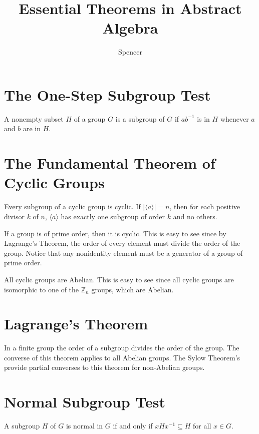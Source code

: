 \documentclass{article}
\title{Essential Theorems in Abstract Algebra}
\author{Spencer}
\begin{document}
\maketitle

\newcommand{\Z}{\mathbb{Z}}
\newcommand{\N}{\mathbb{N}}
\newcommand{\Q}{\mathbb{Q}}
\newcommand{\Ker}{\mbox{Ker}\,}
\newcommand{\Char}{\mbox{char}\,}

\section*{The One-Step Subgroup Test}

A nonempty subset $H$ of a group $G$ is a subgroup
of $G$ if $ab^{-1}$ is in $H$ whenever $a$ and $b$
are in $H$.

\section*{The Fundamental Theorem of Cyclic Groups}

Every subgroup of a cyclic group is cyclic.
If $|\langle a\rangle|=n$, then for each
positive divisor $k$ of $n$, $\langle a\rangle$
has exactly one subgroup of order $k$ and no others.

If a group is of prime order, then it is cyclic.
This is easy to see since by Lagrange's Theorem,
the order of every element must divide the order
of the group.  Notice that any nonidentity element
must be a generator of a group of prime order.

All cyclic groups are Abelian.  This is easy to
see since all cyclic groups are isomorphic to
one of the $\Z_n$ groups, which are Abelian.

\section*{Lagrange's Theorem}

In a finite group the order of a subgroup divides the
order of the group.  The converse of this theorem applies
to all Abelian groups.  The Sylow Theorem's provide
partial converses to this theorem for non-Abelian groups.

\section*{Normal Subgroup Test}

A subgroup $H$ of $G$ is normal in $G$ if and only if
$xHx^{-1}\subseteq H$ for all $x\in G$.
\end{document}

